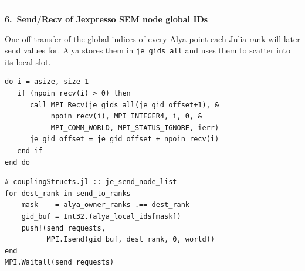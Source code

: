 \documentclass[10pt,landscape]{article}
\newlength{\stepW}\setlength{\stepW}{3.0cm}
\newlength{\codeW}\setlength{\codeW}{10.6cm}
\newcommand{\stepHdr}[1]{%
  \par\medskip
  \noindent\textcolor{ruleC}{\rule{\linewidth}{0.3pt}}\par
  \noindent\textbf{#1}\par\smallskip
}
\begin{document}
\stepHdr{6.\ Send/Recv of Jexpresso SEM node global IDs}
\noindent
\begin{minipage}[t]{\stepW}
\footnotesize One-off transfer of the global indices of every Alya point each Julia rank will later send values for.  Alya stores them in \texttt{je\_gids\_all} and uses them to scatter into its local slot.
\end{minipage}\hfill
\begin{minipage}[t]{\codeW}
\begin{lstlisting}[style=fortran]
do i = asize, size-1
   if (npoin_recv(i) > 0) then
      call MPI_Recv(je_gids_all(je_gid_offset+1), &
           npoin_recv(i), MPI_INTEGER4, i, 0, &
           MPI_COMM_WORLD, MPI_STATUS_IGNORE, ierr)
      je_gid_offset = je_gid_offset + npoin_recv(i)
   end if
end do
\end{lstlisting}
\end{minipage}\hfill
\begin{minipage}[t]{\codeW}
\begin{lstlisting}[style=julia]
# couplingStructs.jl :: je_send_node_list
for dest_rank in send_to_ranks
    mask    = alya_owner_ranks .== dest_rank
    gid_buf = Int32.(alya_local_ids[mask])
    push!(send_requests,
          MPI.Isend(gid_buf, dest_rank, 0, world))
end
MPI.Waitall(send_requests)
\end{lstlisting}
\end{minipage}
\end{document}
